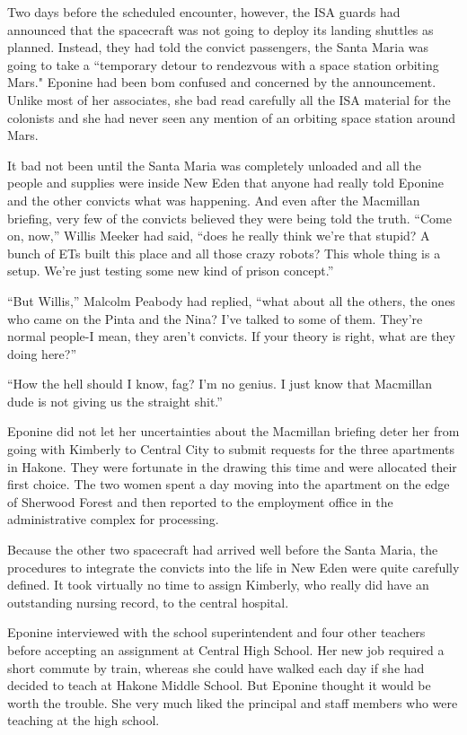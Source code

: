 \documentclass[]{article}
\begin{document}
{Two days before the scheduled encounter, however, the ISA guards had announced that the spacecraft was not going to deploy its landing shuttles as planned.  Instead, they had told the convict passengers, the Santa Maria was going to take a “temporary detour to rendezvous with a space station orbiting Mars."  Eponine had been bom confused and concerned by the announcement.  Unlike most of her associates, she bad read carefully all the ISA material for the colonists and she had never seen any mention of an orbiting space station around Mars.

It bad not been until the Santa Maria was completely unloaded and all the people and supplies were inside New Eden that anyone had really told Eponine and the other convicts what was happening.  And even after the Macmillan briefing, very few of the convicts believed they were being told the truth.  “Come on, now,” Willis Meeker had said, “does he really think we’re that stupid? A bunch of ETs built this place and all those crazy robots? This whole thing is a setup.  We’re just testing some new kind of prison concept.”

“But Willis,” Malcolm Peabody had replied, “what about all the others, the ones who came on the Pinta and the Nina? I’ve talked to some of them.  They’re normal people-I mean, they aren’t convicts.  If your theory is right, what are they doing here?”

“How the hell should I know, fag? I’m no genius.  I just know that Macmillan dude is not giving us the straight shit.”

Eponine did not let her uncertainties about the Macmillan briefing deter her from going with Kimberly to Central City to submit requests for the three apartments in Hakone.  They were fortunate in the drawing this time and were allocated their first choice.  The two women spent a day moving into the apartment on the edge of Sherwood Forest and then reported to the employment office in the administrative complex for processing.

Because the other two spacecraft had arrived well before the Santa Maria, the procedures to integrate the convicts into the life in New Eden were quite carefully defined.  It took virtually no time to assign Kimberly, who really did have an outstanding nursing record, to the central hospital.

Eponine interviewed with the school superintendent and four other teachers before accepting an assignment at Central High School.  Her new job required a short commute by train, whereas she could have walked each day if she had decided to teach at Hakone Middle School.  But Eponine thought it would be worth the trouble.  She very much liked the principal and staff members who were teaching at the high school.

}
\end{document}
